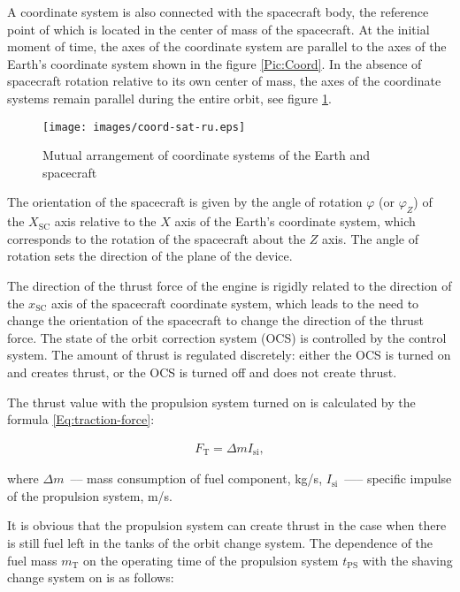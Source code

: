\documentclass[12pt,a4paper]{article}
\begin{document}
A coordinate system is also connected with the spacecraft body, the reference point of which is located in the center of mass of the spacecraft. At the initial moment of time, the axes of the coordinate system are parallel to the axes of the Earth's coordinate system shown in the figure \ref{Pic:Coord}. In the absence of spacecraft rotation relative to its own center of mass, the axes of the coordinate systems remain parallel during the entire orbit, see figure \ref{Pic:Coord-Sat}.

\begin{figure}[tbh]
  \begin{center}
    \texttt{[image: images/coord-sat-ru.eps]}
    \caption{Mutual arrangement of coordinate systems of the Earth and spacecraft}
    \label{Pic:Coord-Sat}
  \end{center}
\end{figure}

The orientation of the spacecraft is given by the angle of rotation $\varphi$ (or $\varphi_Z$) of the $X_{\text{SC}}$ axis relative to the $X$ axis of the Earth's coordinate system, which corresponds to the rotation of the spacecraft about the $Z$ axis. The angle of rotation sets the direction of the plane of the device.

The direction of the thrust force of the engine is rigidly related to the direction of the $x_{\text{SC}}$ axis of the spacecraft coordinate system, which leads to the need to change the orientation of the spacecraft to change the direction of the thrust force. The state of the orbit correction system (OCS) is controlled by the control system. The amount of thrust is regulated discretely: either the OCS is turned on and creates thrust, or the OCS is turned off and does not create thrust.

The thrust value with the propulsion system turned on is calculated by the formula
\ref{Eq:traction-force}:

\begin{eqnarray}
  F_{\text{T}} = \Delta m I_{\text{si}}, \label{Eq:traction-force}
\end{eqnarray}

where $\Delta m$~--– mass consumption of fuel component, kg/s, $I_{\text{si}}$~---– specific impulse of the propulsion system, m/s.

It is obvious that the propulsion system can create thrust in the case when there is still fuel left in the tanks of the orbit change system. The dependence of the fuel mass $m_{\text{T}}$ on the operating time of the propulsion system $t_{\text{PS}}$ with the shaving change system on is as follows:
\end{document}
